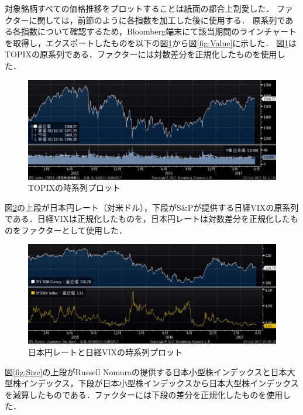﻿\documentclass[a4paper]{jarticle}
\begin{document}
対象銘柄すべての価格推移をプロットすることは紙面の都合上割愛した．
ファクターに関しては，前節のように各指数を加工した後に使用する．
原系列である各指数について確認するため，Bloomberg端末にて該当期間のラインチャートを取得し，エクスポートしたものを以下の図\ref{fig:TOPIX}から図\ref{fig:Value}に示した．
図\ref{fig:TOPIX}はTOPIXの原系列である．ファクターには対数差分を正規化したものを使用した．
\begin{figure}[H]
	\begin{center}
		\includegraphics[width=15cm]{./fig/TOPIX.jpg}
		\caption{TOPIXの時系列プロット}
		\label{fig:TOPIX}
	\end{center}
\end{figure}
図\ref{fig:VIX_JPY}の上段が日本円レート（対米ドル），下段がS\&Pが提供する日経VIXの原系列である．日経VIXは正規化したものを，日本円レートは対数差分を正規化したものをファクターとして使用した．
\begin{figure}[H]
	\begin{center}
		\includegraphics[width=15cm]{./fig/VIX_JPY.jpg}
		\caption{日本円レートと日経VIXの時系列プロット}
		\label{fig:VIX_JPY}
	\end{center}
\end{figure}
図\ref{fig:Size}の上段がRussell Nomuraの提供する日本小型株インデックスと日本大型株インデックス，下段が日本小型株インデックスから日本大型株インデックスを減算したものである．ファクターには下段の差分を正規化したものを使用した．
\end{document}
